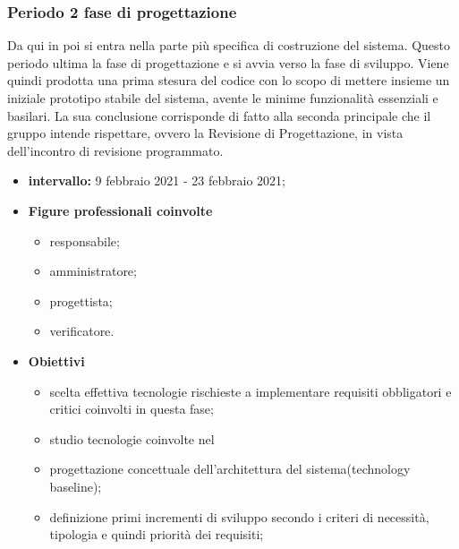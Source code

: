             \subsubsection{Periodo 2 fase di progettazione}
        
            Da qui in poi si entra nella parte più specifica di costruzione del sistema. Questo periodo ultima la fase di progettazione e si avvia verso la fase di sviluppo. Viene quindi prodotta una prima stesura del codice con lo scopo di mettere insieme un iniziale prototipo stabile del sistema, avente le minime funzionalità essenziali e basilari. La sua conclusione corrisponde di fatto alla seconda  principale che il gruppo \Gruppo{} intende rispettare, ovvero la Revisione di Progettazione, in vista dell'incontro di revisione programmato.
    
            \begin{itemize}
                \item \textbf{intervallo: }9 febbraio 2021 - 23 febbraio 2021;
            
            \item  \textbf{Figure professionali coinvolte}
                \begin{itemize}
                    \item responsabile;
                    \item amministratore;
                    \item progettista;
                    \item verificatore.
                \end{itemize}
    
                \item \textbf{Obiettivi}  
                            \begin{itemize}
                                \item scelta effettiva tecnologie rischieste a implementare requisiti obbligatori e critici coinvolti in questa fase;
                                \item studio tecnologie coinvolte nel 
                                \item progettazione concettuale dell'architettura del sistema(technology baseline);
                                \item definizione primi incrementi di sviluppo secondo i criteri di necessità, tipologia e quindi priorità dei requisiti;
                            \end{itemize}
                \end{itemize}          
            
